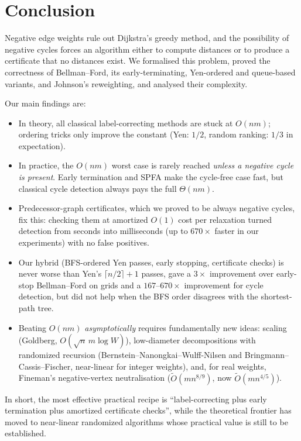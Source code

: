 \documentclass[11pt,a4paper]{article}
\theoremstyle{definition}
\newcommand{\Ot}{\tilde{O}}
\begin{document}
\section{Conclusion}


Negative edge weights rule out Dijkstra's greedy method, and the possibility of negative cycles forces an algorithm either to compute distances or to produce a certificate that no distances exist. We formalised this problem, proved the correctness of Bellman--Ford, its early-terminating, Yen-ordered and queue-based variants, and Johnson's reweighting, and analysed their complexity.

Our main findings are:
\begin{itemize}
\item In theory, all classical label-correcting methods are stuck at $O(nm)$; ordering tricks only improve the constant (Yen: $1/2$, random ranking: $1/3$ in expectation).
\item In practice, the $O(nm)$ worst case is rarely reached \emph{unless a negative cycle is present}. Early termination and SPFA make the cycle-free case fast, but classical cycle detection always pays the full $\Theta(nm)$.
\item Predecessor-graph certificates, which we proved to be always negative cycles, fix this: checking them at amortized $O(1)$ cost per relaxation turned detection from seconds into milliseconds (up to $670\times$ faster in our experiments) with no false positives.
\item Our hybrid (BFS-ordered Yen passes, early stopping, certificate checks) is never worse than Yen's $\lceil n/2\rceil+1$ passes, gave a $3\times$ improvement over early-stop Bellman--Ford on grids and a $167$--$670\times$ improvement for cycle detection, but did not help when the BFS order disagrees with the shortest-path tree.
\item Beating $O(nm)$ \emph{asymptotically} requires fundamentally new ideas: scaling (Goldberg, $O(\sqrt n\,m\log W)$), low-diameter decompositions with randomized recursion (Bernstein--Nanongkai--Wulff-Nilsen and Bringmann--Cassis--Fischer, near-linear for integer weights), and, for real weights, Fineman's negative-vertex neutralisation ($\Ot(mn^{8/9})$, now $\Ot(mn^{4/5})$).
\end{itemize}
In short, the most effective practical recipe is ``label-correcting plus early termination plus amortized certificate checks'', while the theoretical frontier has moved to near-linear randomized algorithms whose practical value is still to be established.
\end{document}
